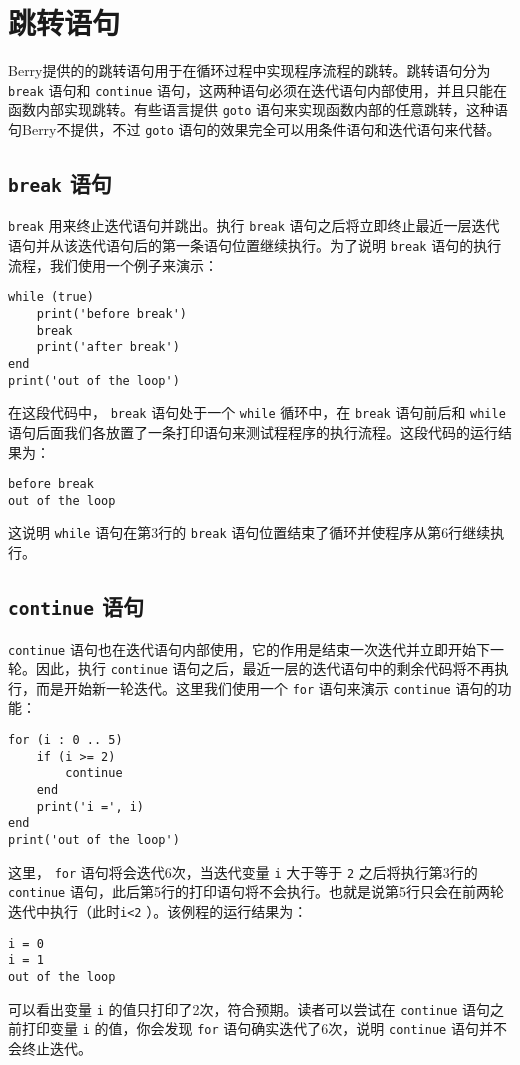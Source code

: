 \section{跳转语句}

Berry提供的的跳转语句用于在循环过程中实现程序流程的跳转。跳转语句分为 \texttt{break} 语句和 \texttt{continue} 语句，这两种语句必须在迭代语句内部使用，并且只能在函数内部实现跳转。有些语言提供 \texttt{goto} 语句来实现函数内部的任意跳转，这种语句Berry不提供，不过 \texttt{goto} 语句的效果完全可以用条件语句和迭代语句来代替。

\subsection{\texttt{break} 语句}

\texttt{break} 用来终止迭代语句并跳出。执行 \texttt{break} 语句之后将立即终止最近一层迭代语句并从该迭代语句后的第一条语句位置继续执行。为了说明 \texttt{break} 语句的执行流程，我们使用一个例子来演示：
\begin{lstlisting}[language=berry]
while (true)
    print('before break')
    break
    print('after break')
end
print('out of the loop')
\end{lstlisting}
在这段代码中， \texttt{break} 语句处于一个 \texttt{while} 循环中，在 \texttt{break} 语句前后和 \texttt{while} 语句后面我们各放置了一条打印语句来测试程程序的执行流程。这段代码的运行结果为：
\begin{lstlisting}[numbers=none]
before break
out of the loop
\end{lstlisting}
这说明 \texttt{while} 语句在第3行的 \texttt{break} 语句位置结束了循环并使程序从第6行继续执行。

\subsection{\texttt{continue} 语句}

 \texttt{continue} 语句也在迭代语句内部使用，它的作用是结束一次迭代并立即开始下一轮。因此，执行 \texttt{continue} 语句之后，最近一层的迭代语句中的剩余代码将不再执行，而是开始新一轮迭代。这里我们使用一个 \texttt{for} 语句来演示 \texttt{continue} 语句的功能：
\begin{lstlisting}[language=berry]
for (i : 0 .. 5)
    if (i >= 2)
        continue
    end
    print('i =', i)
end
print('out of the loop')
\end{lstlisting}
这里， \texttt{for} 语句将会迭代6次，当迭代变量 \texttt{i} 大于等于 \texttt{2} 之后将执行第3行的 \texttt{continue} 语句，此后第5行的打印语句将不会执行。也就是说第5行只会在前两轮迭代中执行（此时\texttt{i<2} ）。该例程的运行结果为：
\begin{lstlisting}[numbers=none]
i = 0
i = 1
out of the loop
\end{lstlisting}
可以看出变量 \texttt{i} 的值只打印了2次，符合预期。读者可以尝试在 \texttt{continue} 语句之前打印变量 \texttt{i} 的值，你会发现 \texttt{for} 语句确实迭代了6次，说明 \texttt{continue} 语句并不会终止迭代。

